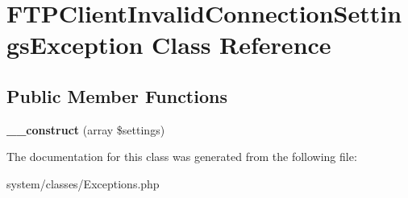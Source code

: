 \hypertarget{class_f_t_p_client_invalid_connection_settings_exception}{
\section{FTPClientInvalidConnectionSettingsException Class Reference}
\label{class_f_t_p_client_invalid_connection_settings_exception}
}
\subsection*{Public Member Functions}
\begin{DoxyCompactItemize}
\item 
\hypertarget{class_f_t_p_client_invalid_connection_settings_exception_aaafb16d9a0748c972cfb538b7a7f3097}{
{\bfseries \_\-\_\-construct} (array \$settings)}
\label{class_f_t_p_client_invalid_connection_settings_exception_aaafb16d9a0748c972cfb538b7a7f3097}

\end{DoxyCompactItemize}


The documentation for this class was generated from the following file:\begin{DoxyCompactItemize}
\item 
system/classes/Exceptions.php\end{DoxyCompactItemize}
